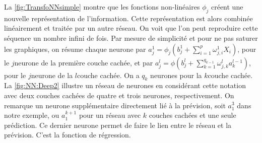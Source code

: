 \begin{figure}[h]
\end{figure}

La \autoref{fig:TransfoNNsimple} montre que les fonctions non-linéaires $\phi_j$ créent une nouvelle représentation de l'information. Cette représentation est alors combinée linéairement et traitée par un autre réseau. On voit que l'on peut reproduire cette séquence un nombre infini de fois. Par mesure de simplicité et pour ne pas saturer les graphiques, on résume chaque neurone par $a_j^1 = \phi_j \left(b_j^1 + \sum_{i=1}^p \omega_{j,i}^1 X_i \right)$, pour le $j$\ieme neurone de la première couche cachée, et par $a_j^l  = \phi \left( b_j^l+ \sum_{k=1}^{q_{k-1}} \omega_{j,k}^l a_k^{l-1} \right)$, pour le $j$\ieme neurone de la $l$\ieme couche cachée. On a $q_k$ neurones pour la $k$\ieme couche cachée. La \autoref{fig:NN:Deep2} illustre un réseau de neurones en considérant cette notation avec deux couches cachées de quatre et trois neurones, respectivement. On remarque un neurone supplémentaire directement lié à la prévision, soit $a_1^3$ dans notre exemple, ou $a_1^{k+1}$ pour un réseau avec $k$ couches cachées et une seule prédiction. Ce dernier neurone permet de faire le lien entre le réseau et la prévision. C'est la fonction de régression.  

